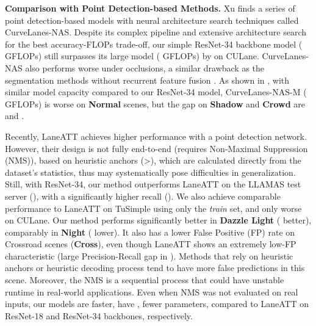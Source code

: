 \documentclass[10pt,twocolumn,letterpaper]{article}
\begin{document}
\noindent \textbf{Comparison with Point Detection-based Methods.} Xu \etal \cite{xu2020curvelane} finds a series of point detection-based models with neural architecture search techniques called CurveLanes-NAS. Despite its complex pipeline and extensive architecture search for the best accuracy-FLOPs trade-off, our simple ResNet-34 backbone model ( GFLOPs) still surpasses its large model ( GFLOPs) by  on CULane. CurveLanes-NAS also performs worse under occlusions, a similar drawback as the segmentation methods without recurrent feature fusion \cite{deeplabv1,qin2020ultra}. As shown in , with similar model capacity compared to our ResNet-34 model, CurveLanes-NAS-M ( GFLOPs) is  worse on \textbf{Normal} scenes, but the gap on \textbf{Shadow} and \textbf{Crowd} are  and .


Recently, LaneATT \cite{tabelini2021keep} achieves higher performance with a point detection network. However, their design is not fully end-to-end (requires Non-Maximal Suppression (NMS)), based on heuristic anchors (\textgreater ), which are calculated directly from the dataset's statistics, thus may systematically pose difficulties in generalization. Still, with ResNet-34, our method outperforms LaneATT on the LLAMAS \cite{llamas2019} test server (), with a significantly higher recall (). We also achieve comparable performance to LaneATT on TuSimple \cite{tusimple} using only the \textit{train} set, and only  worse on CULane. Our method performs significantly better in \textbf{Dazzle Light} ( better), comparably in \textbf{Night} ( lower). It also has a lower False Positive (FP) rate on Crossroad scenes (\textbf{Cross}), even though LaneATT shows an extremely low-FP characteristic (large Precision-Recall gap in ). Methods that rely on heuristic anchors \cite{tabelini2021keep} or heuristic decoding process \cite{pan2018spatial,zheng2021resa,qin2020ultra,xu2020curvelane} tend to have more false predictions in this scene. Moreover, the NMS is a sequential process that could have unstable runtime in real-world applications. Even when NMS was not evaluated on real inputs, our models are  faster, have ,  fewer parameters, compared to LaneATT on ResNet-18 and ResNet-34 backbones, respectively. 
\end{document}
